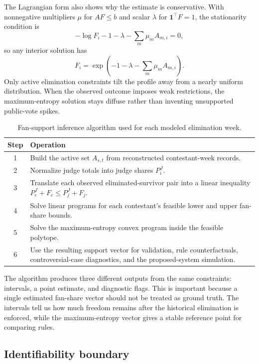 \documentclass[12pt]{article}
\begin{document}
The Lagrangian form also shows why the estimate is conservative. With
nonnegative multipliers $\mu$ for $AF\le b$ and scalar $\lambda$ for
$\mathbf{1}^{\top}F=1$, the stationarity condition is
\[
  -\log F_i-1-\lambda-\sum_m \mu_m A_{m,i}=0,
\]
so any interior solution has
\[
  F_i=\exp\!\left(-1-\lambda-\sum_m \mu_m A_{m,i}\right).
\]
Only active elimination constraints tilt the profile away from a nearly
uniform distribution. When the observed outcome imposes weak restrictions, the
maximum-entropy solution stays diffuse rather than inventing unsupported
public-vote spikes.

\begin{table}[!htbp]
  \centering
  \caption{Fan-support inference algorithm used for each modeled elimination week.}
  \label{tab:algorithm}
  \begin{tabularx}{0.96\linewidth}{cX}
    \toprule
    Step & Operation \\
    \midrule
    1 & Build the active set $A_{s,t}$ from reconstructed contestant-week records. \\
    2 & Normalize judge totals into judge shares $P^J_i$. \\
    3 & Translate each observed eliminated-survivor pair into a linear inequality
    $P^J_e+F_e\le P^J_j+F_j$. \\
    4 & Solve linear programs for each contestant's feasible lower and upper
    fan-share bounds. \\
    5 & Solve the maximum-entropy convex program inside the feasible polytope. \\
    6 & Use the resulting support vector for validation, rule counterfactuals,
    controversial-case diagnostics, and the proposed-system simulation. \\
    \bottomrule
  \end{tabularx}
\end{table}

The algorithm produces three different outputs from the same constraints:
intervals, a point estimate, and diagnostic flags. This is important because a
single estimated fan-share vector should not be treated as ground truth. The
intervals tell us how much freedom remains after the historical elimination is
enforced, while the maximum-entropy vector gives a stable reference point for
comparing rules.

\subsection{Identifiability boundary}
\end{document}
